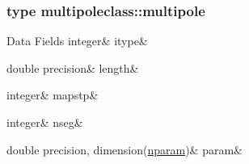 \subsubsection{type multipoleclass\+::multipole}
\begin{DoxyFields}{Data Fields}
\mbox{\label{namespacemultipoleclass_a0819a9c738ccf5ddd0aa69c2a7befd2a}} 
integer&
itype&
\\
\hline

\mbox{\label{namespacemultipoleclass_aa096a41e77f2a963837b3ec8d5b3324b}} 
double precision&
length&
\\
\hline

\mbox{\label{namespacemultipoleclass_a4d8dd9ec28f1f2396c1fe8634b1ffb81}} 
integer&
mapstp&
\\
\hline

\mbox{\label{namespacemultipoleclass_a7e808e5433de77a1defc9a21691400dc}} 
integer&
nseg&
\\
\hline

\mbox{\label{namespacemultipoleclass_ab06c87e37bb85347c808f7e43bd9bd1f}} 
double precision, dimension(\mbox{\hyperlink{namespacemultipoleclass_a67bb1a71461cf39cdd365adab7fec8b9}{nparam}})&
param&
\\
\hline

\end{DoxyFields}
